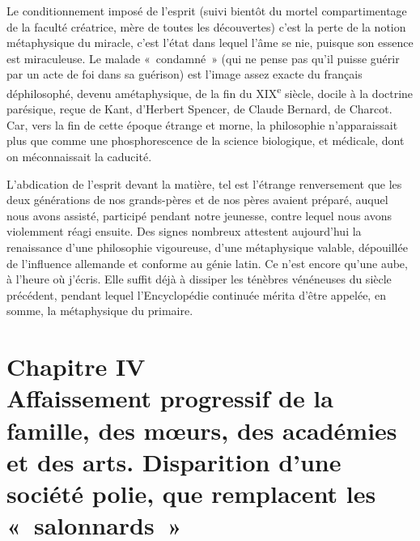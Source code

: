 \documentclass[french,twoside]{book} %
\newcommand\chapteropen{} %
\newcommand\chapterclose{} %
\begin{document}
Le conditionnement imposé de l’esprit (suivi bientôt du mortel compartimentage de la faculté créatrice, mère de toutes les découvertes) c’est la perte de la notion métaphysique du miracle, c’est l’état dans lequel l’âme se nie, puisque son essence est miraculeuse. Le malade « condamné » (qui ne pense pas qu’il puisse guérir par un acte de foi dans sa guérison) est l’image assez exacte du français déphilosophé, devenu amétaphysique, de la fin du XIX\textsuperscript{e} siècle, docile à la doctrine parésique, reçue de Kant, d’Herbert Spencer, de Claude Bernard, de Charcot. Car, vers la fin de cette époque étrange et morne, la philosophie n’apparaissait plus que comme une phosphorescence de la science biologique, et médicale, dont on méconnaissait la caducité.\par
L’abdication de l’esprit devant la matière, tel est l’étrange renversement que les deux générations de nos grands-pères et de nos pères avaient préparé, auquel nous avons assisté, participé pendant notre jeunesse, contre lequel nous avons violemment réagi ensuite. Des signes nombreux attestent aujourd’hui la renaissance d’une philosophie vigoureuse, d’une métaphysique valable, dépouillée de l’influence allemande et conforme au génie latin. Ce n’est encore qu’une aube, à l’heure où j’écris. Elle suffit déjà à dissiper les ténèbres vénéneuses du siècle précédent, pendant lequel l’Encyclopédie continuée mérita d’être appelée, en somme, la métaphysique du primaire.
\chapterclose


\chapteropen
\chapter[{Chapitre IV. Affaissement progressif de la famille, des mœurs, des académies et des arts. Disparition d’une société polie, que remplacent les « salonnards »}]{Chapitre IV\\
Affaissement progressif de la famille, des mœurs, des académies et des arts. Disparition d’une société polie, que remplacent les « salonnards »}\renewcommand{\leftmark}{Chapitre IV\\
Affaissement progressif de la famille, des mœurs, des académies et des arts. Disparition d’une société polie, que remplacent les « salonnards »}
\end{document}
